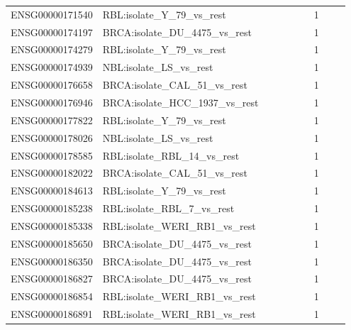 \begin{landscape}
{\begin{longtable}{p{0.18\linewidth}p{0.65\linewidth}p{0.12\linewidth}}
ENSG00000171540 & RBL:isolate\_\allowbreak{}Y\_\allowbreak{}79\_\allowbreak{}vs\_\allowbreak{}rest & 1 \\
ENSG00000174197 & BRCA:isolate\_\allowbreak{}DU\_\allowbreak{}4475\_\allowbreak{}vs\_\allowbreak{}rest & 1 \\
ENSG00000174279 & RBL:isolate\_\allowbreak{}Y\_\allowbreak{}79\_\allowbreak{}vs\_\allowbreak{}rest & 1 \\
ENSG00000174939 & NBL:isolate\_\allowbreak{}LS\_\allowbreak{}vs\_\allowbreak{}rest & 1 \\
ENSG00000176658 & BRCA:isolate\_\allowbreak{}CAL\_\allowbreak{}51\_\allowbreak{}vs\_\allowbreak{}rest & 1 \\
ENSG00000176946 & BRCA:isolate\_\allowbreak{}HCC\_\allowbreak{}1937\_\allowbreak{}vs\_\allowbreak{}rest & 1 \\
ENSG00000177822 & RBL:isolate\_\allowbreak{}Y\_\allowbreak{}79\_\allowbreak{}vs\_\allowbreak{}rest & 1 \\
ENSG00000178026 & NBL:isolate\_\allowbreak{}LS\_\allowbreak{}vs\_\allowbreak{}rest & 1 \\
ENSG00000178585 & RBL:isolate\_\allowbreak{}RBL\_\allowbreak{}14\_\allowbreak{}vs\_\allowbreak{}rest & 1 \\
ENSG00000182022 & BRCA:isolate\_\allowbreak{}CAL\_\allowbreak{}51\_\allowbreak{}vs\_\allowbreak{}rest & 1 \\
ENSG00000184613 & RBL:isolate\_\allowbreak{}Y\_\allowbreak{}79\_\allowbreak{}vs\_\allowbreak{}rest & 1 \\
ENSG00000185238 & RBL:isolate\_\allowbreak{}RBL\_\allowbreak{}7\_\allowbreak{}vs\_\allowbreak{}rest & 1 \\
ENSG00000185338 & RBL:isolate\_\allowbreak{}WERI\_\allowbreak{}RB1\_\allowbreak{}vs\_\allowbreak{}rest & 1 \\
ENSG00000185650 & BRCA:isolate\_\allowbreak{}DU\_\allowbreak{}4475\_\allowbreak{}vs\_\allowbreak{}rest & 1 \\
ENSG00000186350 & BRCA:isolate\_\allowbreak{}DU\_\allowbreak{}4475\_\allowbreak{}vs\_\allowbreak{}rest & 1 \\
ENSG00000186827 & BRCA:isolate\_\allowbreak{}DU\_\allowbreak{}4475\_\allowbreak{}vs\_\allowbreak{}rest & 1 \\
ENSG00000186854 & RBL:isolate\_\allowbreak{}WERI\_\allowbreak{}RB1\_\allowbreak{}vs\_\allowbreak{}rest & 1 \\
ENSG00000186891 & RBL:isolate\_\allowbreak{}WERI\_\allowbreak{}RB1\_\allowbreak{}vs\_\allowbreak{}rest & 1 \\

\end{longtable}}
\end{landscape}
